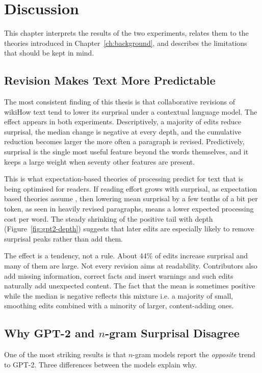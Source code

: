 \documentclass[12pt,a4paper,oneside]{report}
\begin{document}
\chapter{Discussion}
\label{ch:discussion}

This chapter interprets the results of the two experiments, relates them to the theories introduced in Chapter~\ref{ch:background}, and describes the limitations that should be kept in mind.

\section{Revision Makes Text More Predictable}
The most consistent finding of this thesis is that collaborative revisions of wikiHow text tend to lower its surprisal under a contextual language model. The effect appears in both experiments. Descriptively, a majority of edits reduce surprisal, the median change is negative at every depth, and the cumulative reduction becomes larger the more often a paragraph is revised. Predictively, surprisal is the single most useful feature beyond the words themselves, and it keeps a large weight when seventy other features are present.

This is what expectation-based theories of processing predict for text that is being optimised for readers. If reading effort grows with surprisal, as expectation based theories assume \citep{hale2001}, then lowering mean surprisal by a few tenths of a bit per token, as seen in heavily revised paragraphs, means a lower expected processing cost per word. The steady shrinking of the positive tail with depth (Figure~\ref{fig:gpt2-depth}) suggests that later edits are especially likely to remove surprisal peaks rather than add them.

The effect is a tendency, not a rule. About 44\% of edits increase surprisal and many of them are large. Not every revision aims at readability. Contributors also add missing information, correct facts and insert warnings and such edits naturally add unexpected content. The fact that the mean is sometimes positive while the median is negative reflects this mixture i.e. a majority of small, smoothing edits combined with a minority of larger, content-adding ones.

\section{Why GPT-2 and $n$-gram Surprisal Disagree}
One of the most striking results is that $n$-gram models report the \emph{opposite} trend to GPT-2. Three differences between the models explain why.
\end{document}
